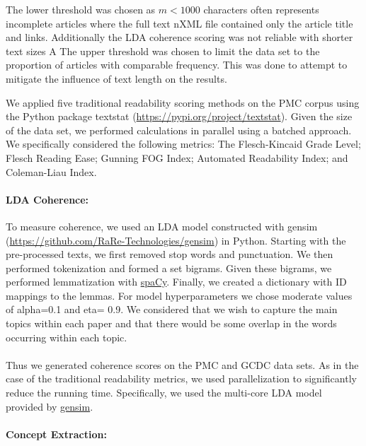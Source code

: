 \documentclass[11pt,a4paper]{article}
\begin{document}
The lower threshold was chosen as \(m < 1000\) characters often represents incomplete articles where the full text nXML file contained only the article title and links. Additionally the LDA coherence scoring was not reliable with shorter text sizes A The upper threshold was chosen to limit the data set to the proportion of articles with comparable frequency. This was done to attempt to mitigate the influence of text length on the results.

We applied five traditional readability scoring methods on the PMC corpus using the Python package textstat (\url{https://pypi.org/project/textstat}). Given the size of the data set, we performed calculations in parallel using a batched approach. We specifically considered the following metrics: The Flesch-Kincaid Grade Level; Flesch Reading Ease; Gunning FOG Index; Automated Readability Index; and Coleman-Liau Index.

\paragraph{LDA Coherence:}
To measure coherence, we used an LDA model constructed with gensim (\url{https://github.com/RaRe-Technologies/gensim}) in Python. Starting with the pre-processed texts, we first removed stop words and punctuation. We then performed tokenization and formed a set bigrams. Given these bigrams, we performed lemmatization with \href{https://spacy.io/}{spaCy}. Finally, we created a dictionary with ID mappings to the lemmas. For model hyperparameters we chose moderate values of alpha=0.1 and eta= 0.9. We considered that we wish to capture the main topics within each paper and that there would be some overlap in the words occurring within each topic. 

\paragraph{}
Thus we generated coherence scores on the PMC and GCDC \cite{Lai2018-qp} data sets. As in the case of the traditional readability metrics, we used parallelization to significantly reduce the running time. Specifically, we used the multi-core LDA model provided by \href{https://github.com/RaRe-Technologies/gensim}{gensim}.

\paragraph{Concept Extraction:}
\end{document}
